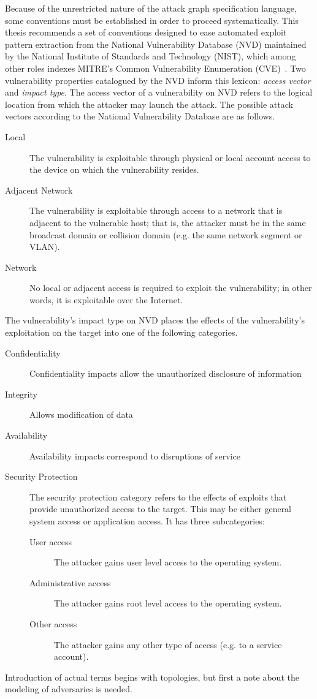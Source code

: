 Because of the unrestricted nature of the attack graph specification language, 
some conventions must be established in order to proceed systematically. This
thesis recommends
a set of conventions designed to ease automated exploit pattern extraction
from the National Vulnerability Database (NVD) maintained by the 
National Institute of Standards and Technology (NIST), which among other roles
indexes MITRE's Common Vulnerability Enumeration (CVE)~\cite{nvdhome}.
Two vulnerability properties catalogued by the NVD inform this lexicon:
\emph{access vector} and \emph{impact type}.
The access vector of a vulnerability on NVD refers to the logical location from
which the attacker may launch the attack. The possible attack vectors according
to the National Vulnerability Database are as follows.
\begin{description}
\item[Local] The vulnerability is exploitable through physical or local account access
    to the device on which the vulnerability resides.
\item[Adjacent Network] The vulnerability is exploitable through access to a network
    that is adjacent to the vulnerable host; that is, the attacker must be in the same
    broadcast domain or collision domain (e.g. the same network segment or VLAN).
\item[Network] No local or adjacent access is required to exploit the vulnerability;
    in other words, it is exploitable over the Internet.
\end{description}
The vulnerability's impact type on NVD places the effects of the vulnerability's
exploitation on the target into one of the following categories.
\begin{description}
\item[Confidentiality] Confidentiality impacts allow the unauthorized disclosure 
    of information
\item[Integrity] Allows modification of data
\item[Availability] Availability impacts correspond to disruptions of service
\item[Security Protection] The security protection category refers to the effects
    of exploits that provide unauthorized access to the target. This may be either
    general system access or application access. It has three subcategories:
    \begin{description}
    \item[User access] The attacker gains user level access to the operating 
        system.
    \item[Administrative access] The attacker gains root level
        access to the operating system.
    \item[Other access] The attacker gains any other type of access (e.g. to
        a service account).
    \end{description}
\end{description}
Introduction of actual terms begins with topologies, but first a note about the modeling
of adversaries is needed. 

